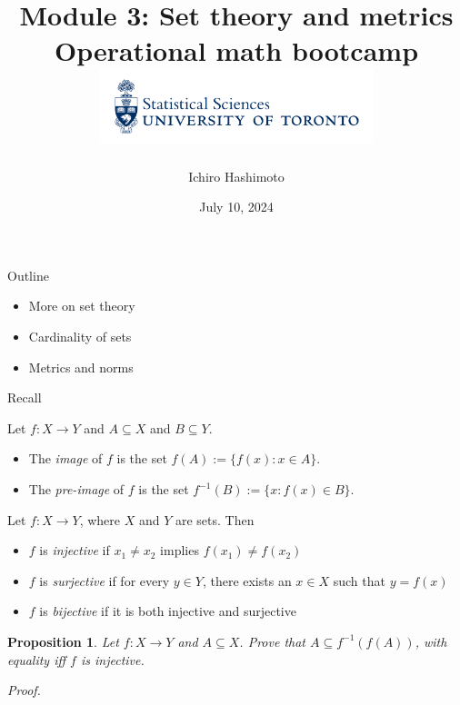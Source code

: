 \documentclass [aspectratio=169]{beamer}
\title[]{Module 3: Set theory and metrics \\ {\large Operational math bootcamp}\\ \includegraphics[width=8cm]{dept_logo.png}\vspace{-1em}}
\author[]{Ichiro Hashimoto}
\institute[]{University of Toronto}
\date{July 10,  2024}
\newtheorem{proposition}[theorem]{Proposition}
\begin{document}
{
\begin{frame}
    \titlepage
\end{frame}
}

\begin{frame}{Outline}
    \begin{itemize}
      \setlength\itemsep{1em}
    	\item More on set theory
	\item Cardinality of sets
	\item Metrics and norms
    \end{itemize}
\end{frame}

\begin{frame}{Recall}
\begin{definition}
Let $f:X \to Y$ and $A \subseteq X$ and $B \subseteq Y$. 
\begin{itemize}
\item The \emph{image} of $f$ is the set $f(A) := \{f(x): x \in A \}$.
\item The \emph{pre-image} of $f$ is the set $f^{-1}(B) := \{x: f(x) \in B \}$.
\end{itemize}
\end{definition}

\vspace{1em}


\begin{definition}
Let $f:X \to Y$, where $X$ and $Y$ are sets. Then
\begin{itemize}
    \item $f$ is \emph{injective} if $x_1 \neq x_2$ implies $f(x_1) \neq f(x_2)$
    \item $f$ is \emph{surjective} if for every $y \in Y$, there exists an $x \in X$ such that $y = f(x)$
    \item $f$ is \emph{bijective} if it is both injective and surjective
\end{itemize}
\end{definition}

\end{frame}

\begin{frame}
\begin{proposition}
Let $f: X \to Y$ and $A \subseteq X$. Prove that $A \subseteq f^{-1}(f(A))$, with equality iff $f$ is injective. 
\end{proposition}
\textit{Proof.}

\vspace{4.5cm}


\end{frame}
\end{document}
